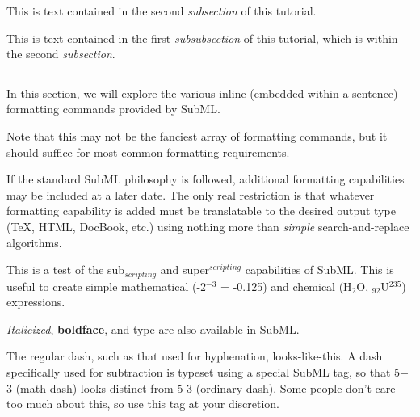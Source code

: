 This is text contained in the second {\it subsection} of this tutorial.
 


\medskip {} \medskip 
 

This is text contained in the first {\it subsubsection} of this tutorial, which is within the second {\it subsection}.
 




\vfil \eject 
\bigskip \hrule \bigskip 
\noindent {} \bigskip 
 

In this section, we will explore the various inline (embedded within a sentence) formatting commands provided by SubML.  
 

 

Note that this may not be the fanciest array of formatting commands, but it should suffice for most common formatting requirements.
 

 

If the standard SubML philosophy is followed, additional formatting capabilities may be included at a later date.  The only real restriction is that whatever formatting capability is added must be translatable to the desired output type (\TeX{}, HTML, DocBook, etc.) using nothing more than {\it simple} search-and-replace algorithms.
 


\bigskip \noindent {} \medskip 
 

This is a test of the sub$_{scripting}$ and super$^{scripting}$ capabilities of SubML.  This is useful to create simple mathematical (-2$^{-3}$ = -0.125) and chemical (H$_{2}$O, $_{92}$U$^{235}$) expressions.
 



\bigskip \noindent {} \medskip 
 

{\it Italicized}, {\bf boldface}, and  type are also available in SubML.
 

 

\bigskip \noindent {} \medskip 
 

The regular dash, such as that used for hyphenation, looks-like-this.  A dash specifically used for subtraction is typeset using a special SubML tag, so that 5$-$3 (math dash) looks distinct from 5-3 (ordinary dash).  Some people don't care too much about this, so use this tag at your discretion.
 

